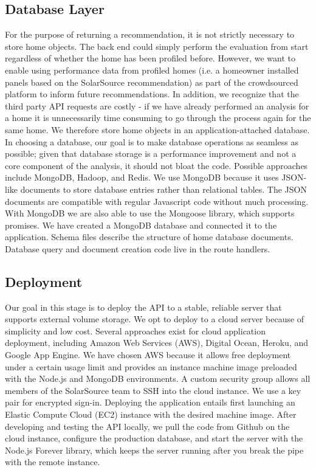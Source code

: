 \documentclass[pageno]{jpaper}
\begin{document}
\subsection{Database Layer}
For the purpose of returning a recommendation, it is not strictly necessary to store home objects. The back end could simply perform the evaluation from start regardless of whether the home has been profiled before. However, we want to enable using performance data from profiled homes (i.e. a homeowner installed panels based on the SolarSource recommendation) as part of the crowdsourced platform to inform future recommendations. In addition, we recognize that the third party API requests are costly - if we have already performed an analysis for a home it is unnecessarily time consuming to go through the process again for the same home. We therefore store home objects in an application-attached database. In choosing a database, our goal is to make database operations as seamless as possible; given that database storage is a performance improvement and not a core component of the analysis, it should not bloat the code. Possible approaches include MongoDB, Hadoop, and Redis. We use MongoDB because it uses JSON-like documents to store database entries rather than relational tables. The JSON documents are compatible with regular Javascript code without much processing. With MongoDB we are also able to use the Mongoose library, which supports promises. We have created a MongoDB database and connected it to the application. Schema files describe the structure of home database documents. Database query and document creation code live in the route handlers.

\subsection{Deployment}
Our goal in this stage is to deploy the API to a stable, reliable server that supports external volume storage. We opt to deploy to a cloud server because of simplicity and low cost. Several approaches exist for cloud application deployment, including Amazon Web Services (AWS), Digital Ocean, Heroku, and Google App Engine. We have chosen AWS because it allows free deployment under a certain usage limit and provides an instance machine image preloaded with the Node.js and MongoDB environments. A custom security group allows all members of the SolarSource team to SSH into the cloud instance. We use a key pair for encrypted sign-in. Deploying the application entails first launching an Elastic Compute Cloud (EC2) instance with the desired machine image. After developing and testing the API locally, we pull the code from Github on the cloud instance, configure the production database, and start the server with the Node.js Forever library, which keeps the server running after you break the pipe with the remote instance.
\end{document}
